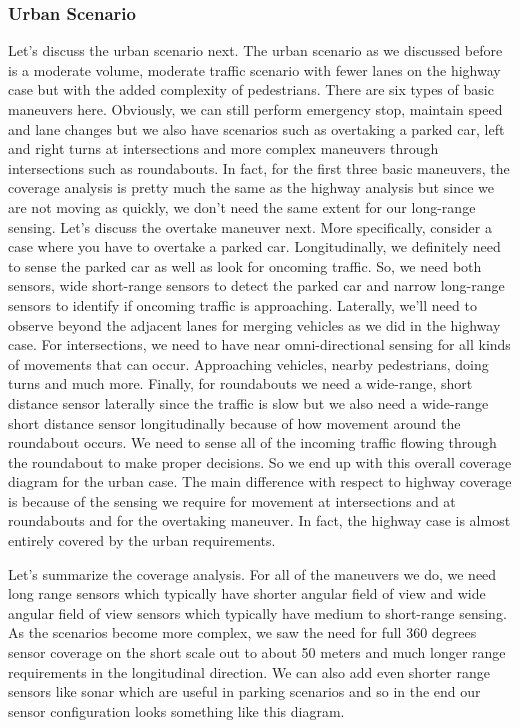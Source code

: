 \subsubsection{Urban Scenario}
Let's discuss the urban scenario next. 
The urban scenario as we discussed before is a moderate volume, moderate traffic scenario with fewer lanes on the highway case but with the added complexity of pedestrians. 
There are six types of basic maneuvers here. Obviously, we can still perform emergency stop, maintain speed and lane changes but we also have scenarios such as overtaking a parked car, 
left and right turns at intersections and more complex maneuvers through intersections such as roundabouts. 
In fact, for the first three basic maneuvers, the coverage analysis is pretty much the same as the highway analysis but since we are not moving as quickly, 
we don't need the same extent for our long-range sensing. 
Let's discuss the overtake maneuver next. 
More specifically, consider a case where you have to overtake a parked car. 
Longitudinally, we definitely need to sense the parked car as well as look for oncoming traffic. 
So, we need both sensors, wide short-range sensors to detect the parked car and narrow long-range sensors to identify if oncoming traffic is approaching. 
Laterally, we'll need to observe beyond the adjacent lanes for merging vehicles as we did in the highway case. 
For intersections, we need to have near omni-directional sensing for all kinds of movements that can occur. 
Approaching vehicles, nearby pedestrians, doing turns and much more. 
Finally, for roundabouts we need a wide-range, short distance sensor laterally since the traffic is slow but 
we also need a wide-range short distance sensor longitudinally because of how movement around the roundabout occurs. 
We need to sense all of the incoming traffic flowing through the roundabout to make proper decisions. 
So we end up with this overall coverage diagram for the urban case. 
The main difference with respect to highway coverage is because of the sensing we require 
for movement at intersections and at roundabouts and for the overtaking maneuver. 
In fact, the highway case is almost entirely covered by the urban requirements. 


Let's summarize the coverage analysis. For all of the maneuvers we do, we need long range sensors which typically 
have shorter angular field of view and wide angular field of view sensors which typically have medium to short-range sensing. 
As the scenarios become more complex, we saw the need for full 360 degrees sensor coverage on the short scale out to 
about 50 meters and much longer range requirements in the longitudinal direction. 
We can also add even shorter range sensors like sonar which are useful in parking scenarios and so in the end our sensor configuration looks something like this diagram. 

